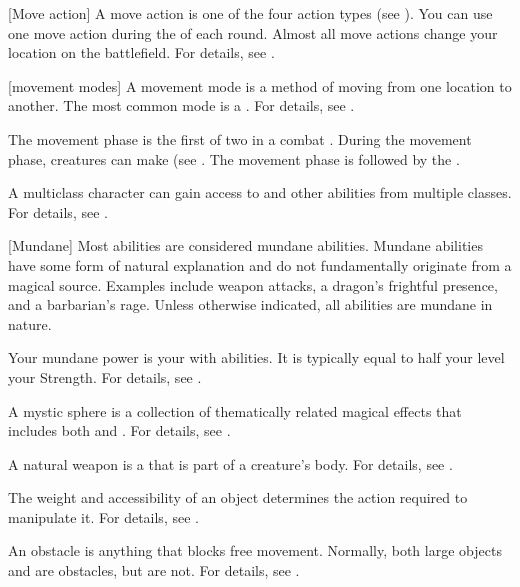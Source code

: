 [Move action] A move action is one of the four action types (see ).
You can use one move action during the  of each round.
Almost all move actions change your location on the battlefield.
For details, see .

[movement modes] A movement mode is a method of moving from one location to another.
The most common mode is a .
For details, see .

 The movement phase is the first of two  in a combat .
During the movement phase, creatures can make  (see .
The movement phase is followed by the .

 A multiclass character can gain access to  and other abilities from multiple classes.
For details, see .

[Mundane] Most abilities are considered mundane abilities.
Mundane abilities have some form of natural explanation and do not fundamentally originate from a magical source.
Examples include weapon attacks, a dragon's frightful presence, and a barbarian's rage.
Unless otherwise indicated, all abilities are mundane in nature.

 Your mundane power is your  with  abilities.
It is typically equal to half your level \add your Strength.
For details, see .

 A mystic sphere is a collection of thematically related magical effects that includes both  and .
For details, see .

 A natural weapon is a  that is part of a creature's body.
For details, see .

 The weight and accessibility of an object determines the action required to manipulate it.
For details, see .

 An obstacle is anything that blocks free movement.
Normally, both large objects and  are obstacles, but  are not.
For details, see .

